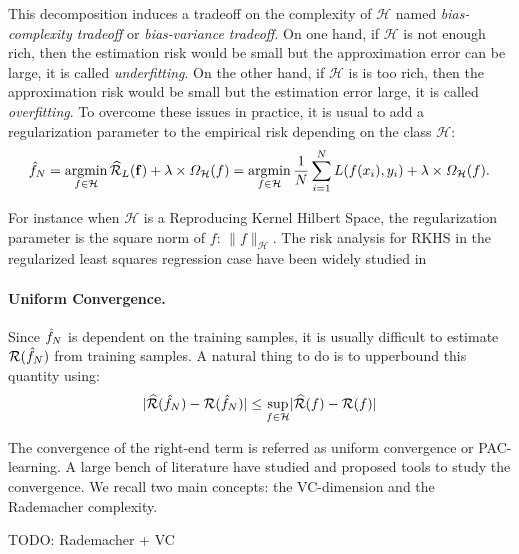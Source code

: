 This decomposition induces a tradeoff on the complexity of $\mathcal{H}$ named \emph{bias-complexity tradeoff} or \emph{bias-variance tradeoff}. On one hand, if $\mathcal{H}$ is not enough rich, then the estimation risk would be small but the approximation error can be large, it is called \emph{underfitting}. On the other hand, if $\mathcal{H}$ is is too rich, then the approximation risk would be small but the estimation error large, it is called \emph{overfitting}. To overcome these issues in practice, it is usual to add a regularization parameter to the empirical risk depending on the class $\mathcal{H}$:
\begin{align*}
    \hat{f}_N = \operatorname*{argmin}_{f\in\mathcal{H}}\widehat{\mathcal{R}}_{L}(\mathbf{f}) +\lambda\times\Omega_\mathcal{H}(f)= \operatorname*{argmin}_{f\in\mathcal{H}}\frac{1}{N}\sum_{i=1}^N L(f(x_i),y_i)+\lambda\times\Omega_\mathcal{H}(f).
\end{align*}

For instance when $\mathcal{H}$ is a Reproducing Kernel Hilbert Space, the regularization parameter is the square norm of $f$: $\lVert f\rVert_\mathcal{H}$. The risk analysis for RKHS in the regularized least squares regression case have been widely studied in~\cite{xxxx} 


\paragraph{Uniform Convergence.} Since $\hat{f}_N$ is dependent on the training samples, it is usually difficult to estimate $\mathcal{R}(\hat{f}_N)$ from training samples. A natural thing to do is to upperbound this quantity using:
\begin{align*}
    \lvert\widehat{\mathcal{R}}(\hat{f}_N) - \mathcal{R}(\hat{f}_N)\rvert\leq\sup_{f\in\mathcal{H}}    \lvert\widehat{\mathcal{R}}(f) - \mathcal{R}(f)\rvert
\end{align*}

The convergence of the right-end term is referred as uniform convergence or PAC-learning. A large bench of literature have studied and proposed tools to study the convergence. We recall two main concepts: the VC-dimension and the Rademacher complexity.

TODO: Rademacher + VC
